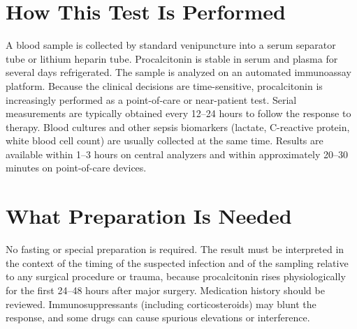\section*{How This Test Is Performed}
A blood sample is collected by standard venipuncture into a serum separator tube or lithium heparin tube. Procalcitonin is stable in serum and plasma for several days refrigerated. The sample is analyzed on an automated immunoassay platform. Because the clinical decisions are time-sensitive, procalcitonin is increasingly performed as a point-of-care or near-patient test. Serial measurements are typically obtained every 12--24 hours to follow the response to therapy. Blood cultures and other sepsis biomarkers (lactate, C-reactive protein, white blood cell count) are usually collected at the same time. Results are available within 1--3 hours on central analyzers and within approximately 20--30 minutes on point-of-care devices.

\section*{What Preparation Is Needed}
No fasting or special preparation is required. The result must be interpreted in the context of the timing of the suspected infection and of the sampling relative to any surgical procedure or trauma, because procalcitonin rises physiologically for the first 24--48 hours after major surgery. Medication history should be reviewed. Immunosuppressants (including corticosteroids) may blunt the response, and some drugs can cause spurious elevations or interference.

